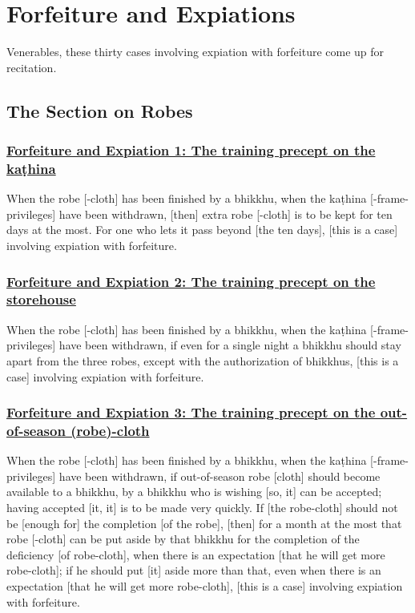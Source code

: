 \section{Forfeiture and Expiations}
\label{forf-exp}

\begin{center}
  Venerables, these thirty cases involving expiation with forfeiture come up for recitation.
\end{center}

\setsubsecheadstyle{\subsectionFmt}
\subsection{The Section on Robes}
\label{forf-exp-robes}
\vspace{0.2cm}

\subsubsection*{\hyperref[np1]{Forfeiture and Expiation 1: The training precept on the kaṭhina}}
\label{forf-exp1}
When the robe [-cloth] has been finished by a bhikkhu, when the kaṭhina [-frame-privileges] have been withdrawn, [then] extra robe [-cloth] is to be kept for ten days at the most. For one who lets it pass beyond [the ten days], [this is a case] involving expiation with forfeiture.

\subsubsection*{\hyperref[np2]{Forfeiture and Expiation 2: The training precept on the storehouse}}
\label{forf-exp2}
When the robe [-cloth] has been finished by a bhikkhu, when the kaṭhina [-frame-privileges] have been withdrawn, if even for a single night a bhikkhu should stay apart from the three robes, except with the authorization of bhikkhus, [this is a case] involving expiation with forfeiture.

\subsubsection*{\hyperref[np3]{Forfeiture and Expiation 3: The training precept on the out-of-season (robe)-cloth}}
\label{forf-exp3}
When the robe [-cloth] has been finished by a bhikkhu, when the kaṭhina [-frame-privileges] have been withdrawn, if out-of-season robe [cloth] should become available to a bhikkhu, by a bhikkhu who is wishing [so, it] can be accepted; having accepted [it, it] is to be made very quickly. If [the robe-cloth] should not be [enough for] the completion [of the robe], [then] for a month at the most that robe [-cloth] can be put aside by that bhikkhu for the completion of the deficiency [of robe-cloth], when there is an expectation [that he will get more robe-cloth]; if he should put [it] aside more than that, even when there is an expectation [that he will get more robe-cloth], [this is a case] involving expiation with forfeiture.

